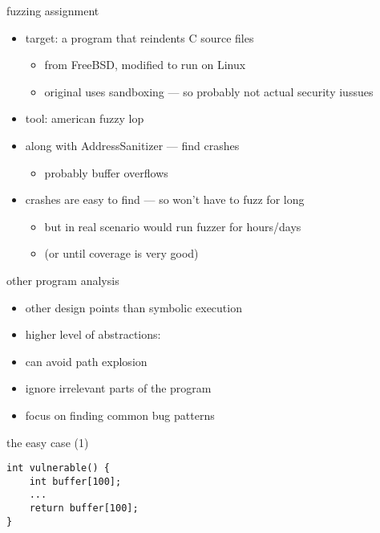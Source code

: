 \begin{frame}{fuzzing assignment}
    \begin{itemize}
    \item target: a program that reindents C source files
        \begin{itemize}
        \item from FreeBSD, modified to run on Linux
        \item original uses sandboxing --- so probably not actual security iussues
        \end{itemize}
    \item tool: american fuzzy lop
    \item along with AddressSanitizer --- find crashes
        \begin{itemize}
            \item probably buffer overflows
        \end{itemize}
    \item crashes are easy to find --- so won't have to fuzz for long
        \begin{itemize}
        \item but in real scenario would run fuzzer for hours/days
        \item (or until coverage is very good)
        \end{itemize}
    \end{itemize}
\end{frame}


\begin{frame}{other program analysis}
    \begin{itemize}
        \item other design points than symbolic execution
        \item higher level of abstractions:
        \vspace{.5cm}
        \item can avoid path explosion
        \item ignore irrelevant parts of the program
        \item focus on finding common bug patterns
    \end{itemize}
\end{frame}

\begin{frame}[fragile,label=easyCase1]{the easy case (1)}
    \lstset{language=C,style=small}
\begin{lstlisting}
int vulnerable() {
    int buffer[100];
    ...
    return buffer[100];
}
\end{lstlisting}
\end{frame}

